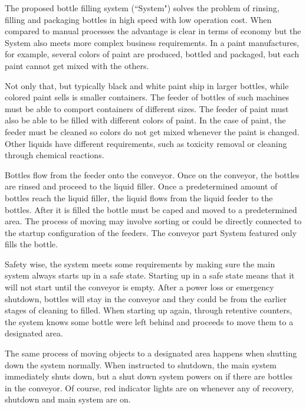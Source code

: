 The proposed bottle filling system (``System") solves the problem of rinsing, filling and packaging bottles in high speed with low operation cost. When compared to manual processes the advantage is clear in terms of economy but the System also meets more complex business requirements. In a paint manufactures, for example, several colors of paint are produced, bottled and packaged, but each paint cannot get mixed with the others.

Not only that, but typically black and white paint ship in larger bottles, while colored paint sells is smaller containers. The feeder of bottles of such machines must be able to comport containers of different sizes. The feeder of paint must also be able to be filled with different colors of paint. In the case of paint, the feeder must be cleaned so colors do not get mixed whenever the paint is changed. Other liquids have different requirements, such as toxicity removal or cleaning through chemical reactions.

Bottles flow from the feeder onto the conveyor. Once on the conveyor, the bottles are rinsed and proceed to the liquid filler. Once a predetermined amount of bottles reach the liquid filler, the liquid flows from the liquid feeder to the bottles. After it is filled the bottle must be caped and moved to a predetermined area. The process of moving may involve sorting or could be directly connected to the startup configuration of the feeders. The conveyor part System featured only fills the bottle. 

Safety wise, the system meets some requirements by making sure the main system always starts up in a safe state. Starting up in a safe state means that it will not start until the conveyor is empty. After a power loss or emergency shutdown, bottles will stay in the conveyor and they could be from the earlier stages of cleaning to filled. When starting up again, through retentive counters, the system knows some bottle were left behind and proceeds to move them to a designated area. 

The same process of moving objects to a designated area happens when shutting down the system normally. When instructed to shutdown, the main system immediately shuts down, but a shut down system powers on if there are bottles in the conveyor. Of course, red indicator lights are on whenever any of recovery, shutdown and main system are on.






